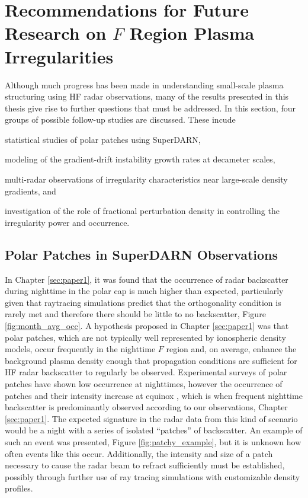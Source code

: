 \section{Recommendations for Future Research on \(F\) Region Plasma Irregularities}
\label{sec:futurework}

Although much progress has been made in understanding small-scale plasma structuring using HF radar observations, many of the results presented in this thesis give rise to further questions that must be addressed.  In this section, four groups of possible follow-up studies are discussed.  These incude 
\begin{enumerate*}[label={(\arabic*)}] 
	\item statistical studies of polar patches using SuperDARN, 
	\item modeling of the gradient-drift instability growth rates at decameter scales, 
	\item multi-radar observations of irregularity characteristics near large-scale density gradients, and 
	\item investigation of the role of fractional perturbation density in controlling the irregularity power and occurrence.
\end{enumerate*}

\subsection{Polar Patches in SuperDARN Observations}
\label{sec:fw_patches}
In Chapter \ref{sec:paper1}, it was found that the occurrence of radar backscatter during nighttime in the polar cap is much higher than expected, particularly given that raytracing simulations predict that the orthogonality condition is rarely met and therefore there should be little to no backscatter, Figure \ref{fig:month_avg_occ}.  A hypothesis proposed in Chapter \ref{sec:paper1} was that polar patches, which are not typically well represented by ionospheric density models, occur frequently in the nighttime \(F\) region and, on average, enhance the background plasma density enough that propagation conditions are sufficient for HF radar backscatter to regularly be observed.  Experimental surveys of polar patches have shown low occurrence at nighttimes, however the occurrence of patches and their intensity increase at equinox \citep{Rodger1996}, which is when frequent nighttime backscatter is predominantly observed according to our observations, Chapter \ref{sec:paper1}.  The expected signature in the radar data from this kind of scenario would be a night with a series of isolated ``patches'' of backscatter.  An example of such an event was presented, Figure \ref{fig:patchy_example}, but it is unknown how often events like this occur.  Additionally, the intensity and size of a patch necessary to cause the radar beam to refract sufficiently must be established, possibly through further use of ray tracing simulations with customizable density profiles.

